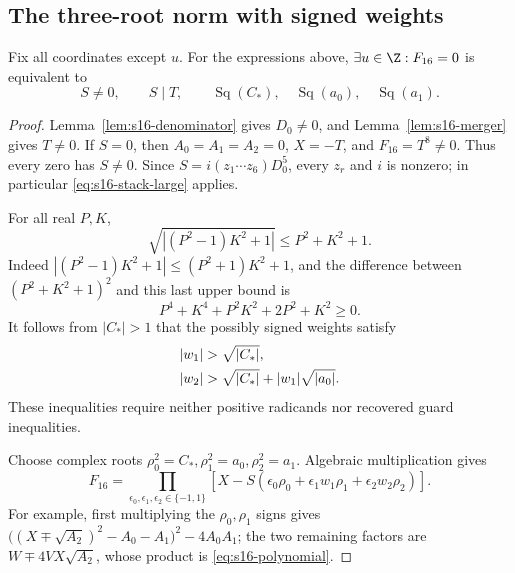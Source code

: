 \subsection{The three-root norm with signed weights}

\begin{lemma}\label{lem:s16-finalizer}
Fix all coordinates except \(u\).
For the expressions above, \(\exists u\in\Z:F_{16}=0\) is equivalent to
\begin{equation}
 S\neq0,\qquad S\mid T,\qquad
 \operatorname{Sq}(C_*),\quad
 \operatorname{Sq}(a_0),\quad
 \operatorname{Sq}(a_1).
 \label{eq:s16-finalizer-interface}
\end{equation}
\end{lemma}
\begin{proof}
Lemma~\ref{lem:s16-denominator} gives \(D_0\neq0\), and
Lemma~\ref{lem:s16-merger} gives \(T\neq0\).
If \(S=0\), then \(A_0=A_1=A_2=0\), \(X=-T\), and
\(F_{16}=T^8\neq0\).
Thus every zero has \(S\neq0\).
Since \(S=i(z_1\cdots z_6)D_0^5\), every \(z_r\) and \(i\) is
nonzero; in particular \eqref{eq:s16-stack-large} applies.

For all real \(P,K\),
\begin{equation}
 \sqrt{|(P^2-1)K^2+1|}\leq P^2+K^2+1 .
 \label{eq:s16-a0-bound}
\end{equation}
Indeed
\(|(P^2-1)K^2+1|\leq(P^2+1)K^2+1\), and the difference between
\((P^2+K^2+1)^2\) and this last upper bound is
\[
 P^4+K^4+P^2K^2+2P^2+K^2\geq0.
\]
It follows from \(|C_*|>1\) that the possibly signed weights satisfy
\begin{align}
 |w_1|&>\sqrt{|C_*|},\notag\\
 |w_2|&>\sqrt{|C_*|}+|w_1|\sqrt{|a_0|}.
 \label{eq:s16-separation}
\end{align}
These inequalities require neither positive radicands nor recovered
guard inequalities.

Choose complex roots
\(\rho_0^2=C_*,\rho_1^2=a_0,\rho_2^2=a_1\).
Algebraic multiplication gives
\begin{equation}
 F_{16}
  =\prod_{\epsilon_0,\epsilon_1,\epsilon_2\in\{-1,1\}}
     \left[
       X-S(\epsilon_0\rho_0+
             \epsilon_1w_1\rho_1+\epsilon_2w_2\rho_2)
     \right].
 \label{eq:s16-eight-factor}
\end{equation}
For example, first multiplying the \(\rho_0,\rho_1\) signs gives
\(\big((X\mp\sqrt{A_2})^2-A_0-A_1\big)^2-4A_0A_1\);
the two remaining factors are
\(W\mp4VX\sqrt{A_2}\), whose product is
\eqref{eq:s16-polynomial}.


\end{proof}
